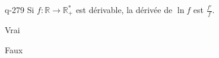 \begin{truefalse}{q-279}
Si $f : \mathbb R \to \mathbb R_+^*$ est dérivable, la dérivée de $\ln f$ est $\frac{f'}{f}$.
\item* Vrai
\item Faux
\end{truefalse}

